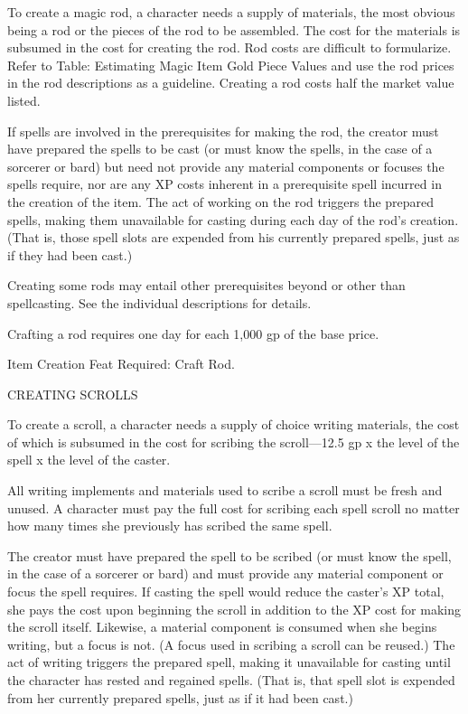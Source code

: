 To create a magic rod, a character needs a supply of materials, the most obvious 
being a rod or the pieces of the rod to be assembled. The cost for the materials 
is subsumed in the cost for creating the rod. Rod costs are difficult to formularize. 
Refer to Table: Estimating Magic Item Gold Piece Values and use the rod prices 
in the rod descriptions as a guideline. Creating a rod costs half the market value 
listed.

If spells are involved in the prerequisites for making the rod, the creator must 
have prepared the spells to be cast (or must know the spells, in the case of a 
sorcerer or bard) but need not provide any material components or focuses the spells 
require, nor are any XP costs inherent in a prerequisite spell incurred in the 
creation of the item. The act of working on the rod triggers the prepared spells, 
making them unavailable for casting during each day of the rod's creation. (That 
is, those spell slots are expended from his currently prepared spells, just as 
if they had been cast.)

Creating some rods may entail other prerequisites beyond or other than spellcasting. 
See the individual descriptions for details.

Crafting a rod requires one day for each 1,000 gp of the base price.

Item Creation Feat Required: Craft Rod.

\vspace{12pt}
{\large CREATING SCROLLS}

To create a scroll, a character needs a supply of choice writing materials, the 
cost of which is subsumed in the cost for scribing the scroll---12.5 gp x the level 
of the spell x the level of the caster.

All writing implements and materials used to scribe a scroll must be fresh and 
unused. A character must pay the full cost for scribing each spell scroll no matter 
how many times she previously has scribed the same spell.

The creator must have prepared the spell to be scribed (or must know the spell, 
in the case of a sorcerer or bard) and must provide any material component or focus 
the spell requires. If casting the spell would reduce the caster's XP total, she 
pays the cost upon beginning the scroll in addition to the XP cost for making the 
scroll itself. Likewise, a material component is consumed when she begins writing, 
but a focus is not. (A focus used in scribing a scroll can be reused.) The act 
of writing triggers the prepared spell, making it unavailable for casting until 
the character has rested and regained spells. (That is, that spell slot is expended 
from her currently prepared spells, just as if it had been cast.)

